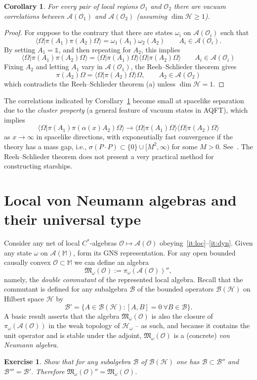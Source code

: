 \documentclass[12pt,a4paper]{article}
\newcommand{\1}{\mathds{1}}                         %
\newcommand{\Ocal}{\mathcal{O}}
\newcommand{\MM}{\mathbb{M}}
\newcommand{\BB}{{\mathcal{B}}}
\newcommand{\HH}{{\mathcal{H}}}
\newcommand{\Mf}{{\mathfrak{M}}}
\newcommand{\II}{{\mathbb{1}}}
\newcommand{\Ac}{{\mathcal{A}}}
\newcommand{\Bc}{{\mathcal{B}}}
\newcommand{\ip}[2]{\langle #1|#2\rangle}
\newtheorem{corollary}[theorem]{Corollary}
\newtheorem{exercise}[theorem]{Exercise}
\begin{document}
\begin{corollary}\label{cor:vaccor}
For every pair of local regions $\Ocal_1$ and $\Ocal_2$ there are vacuum correlations between $\Ac(\Ocal_1)$ and $\Ac(\Ocal_2)$ (assuming $\dim \HH\ge 1$).
\end{corollary}
\begin{proof}
	For suppose to the contrary that there are states $\omega_i$ on $\Ac(\Ocal_i)$ such that 
	\[
	\ip{\Omega}{\pi(A_1)\pi(A_2)\Omega} = \omega_1(A_1)\omega_2(A_2)\qquad A_i\in\Ac(\Ocal_i).
	\]
	By setting $A_1=\II$, and then repeating for $A_2$, this implies 
	\[
	\ip{\Omega}{\pi(A_1)\pi(A_2)\Omega} = 	\ip{\Omega}{\pi(A_1) \Omega}	\ip{\Omega}{ \pi(A_2)\Omega}\qquad A_i\in\Ac(\Ocal_i)
	\] 
	Fixing $A_2$ and letting $A_1$ vary in $\Ac(\Ocal_1)$, the Reeh--Schlieder theorem gives
	\[
	\pi(A_2)\Omega = \ip{\Omega}{ \pi(A_2)\Omega}\Omega,\qquad A_2\in\Ac(\Ocal_2)
	\]
	which contradicts the Reeh--Schlieder theorem (a) unless $\dim\HH=1$. 
\end{proof}
The correlations indicated by Corollary~\ref{cor:vaccor} become small at spacelike separation due to the
\emph{cluster property} (a general feature of vacuum states in AQFT), which implies 
\[
\ip{\Omega}{\pi(A_1)\pi(\alpha(x)A_2)\Omega} \to	\ip{\Omega}{\pi(A_1) \Omega}	\ip{\Omega}{ \pi(A_2)\Omega}
\]
as $x\to\infty$ in spacelike directions, with exponentially fast convergence if the theory has a mass gap, i.e., $\sigma(P\cdot P)\subset\{0\}\cup[M^2,\infty)$ for some $M>0$. See~\cite[\S 4.3-4.4]{Araki}. The Reeh--Schlieder theorem does not present a very practical method for constructing starships.

\section{Local von Neumann algebras and their universal type} \label{sec:universaltype}

Consider any net of local $C^*$-algebras $\Ocal\mapsto\Ac(\Ocal)$ obeying~\ref{it:loc}--\ref{it:dyn}.
Given any state $\omega$ on $\Ac(\MM)$, form its GNS representation. For any open bounded causally convex $\Ocal\subset\MM$ we can define an algebra
\[
\Mf_\omega(\Ocal) := \pi_\omega(\Ac(\Ocal))'',
\]
namely, the \emph{double commutant} of the represented local algebra. Recall that
the commutant is defined for any subalgebra $\Bc$ of the bounded operators $\BB(\HH)$ on Hilbert space $\HH$ by 
\[
\Bc' = \{A\in\BB(\HH): [A,B]=0~\forall B\in\Bc\}.
\]
A basic result asserts that the algebra $\Mf_\omega(\Ocal)$ is also the closure of $\pi_\omega(\Ac(\Ocal))$ in the weak topology of $\HH_\omega$ -- as such, and because it contains the unit operator and is stable under the adjoint, $\Mf_\omega(\Ocal)$ is a (concrete) \emph{von Neumann algebra}. 
\begin{exercise}
	Show that for any subalgebra $\Bc$ of $\Bc(\HH)$ one has $\Bc\subset \Bc''$ and $\Bc'''=\Bc'$.
	Therefore $\Mf_\omega(\Ocal)''=\Mf_\omega(\Ocal)$. 
\end{exercise}
\end{document}
